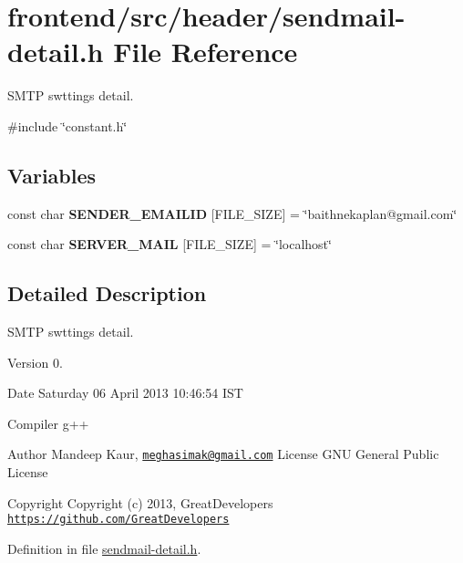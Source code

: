 \hypertarget{sendmail-detail_8h}{\section{frontend/src/header/sendmail-\/detail.h \-File \-Reference}
\label{sendmail-detail_8h}
}


\-S\-M\-T\-P swttings detail.  


{\ttfamily \#include \char`\"{}constant.\-h\char`\"{}}\*
\subsection*{\-Variables}
\begin{DoxyCompactItemize}
\item 
\hypertarget{sendmail-detail_8h_a6a17dd6df02d3a5118873bc84ce9801d}{const char {\bfseries \-S\-E\-N\-D\-E\-R\-\_\-\-E\-M\-A\-I\-L\-I\-D} \mbox{[}\-F\-I\-L\-E\-\_\-\-S\-I\-Z\-E\mbox{]} = \char`\"{}baithnekaplan@gmail.\-com\char`\"{}}\label{sendmail-detail_8h_a6a17dd6df02d3a5118873bc84ce9801d}

\item 
\hypertarget{sendmail-detail_8h_a5a43d9760874d06771eec35419dad507}{const char {\bfseries \-S\-E\-R\-V\-E\-R\-\_\-\-M\-A\-I\-L} \mbox{[}\-F\-I\-L\-E\-\_\-\-S\-I\-Z\-E\mbox{]} = \char`\"{}localhost\char`\"{}}\label{sendmail-detail_8h_a5a43d9760874d06771eec35419dad507}

\end{DoxyCompactItemize}


\subsection{\-Detailed \-Description}
\-S\-M\-T\-P swttings detail. \begin{DoxyVersion}{\-Version}
0. 
\end{DoxyVersion}
\begin{DoxyDate}{\-Date}
\-Saturday 06 \-April 2013 10\-:46\-:54 \-I\-S\-T\par
 \-Compiler g++
\end{DoxyDate}
\begin{DoxyAuthor}{\-Author}
\-Mandeep \-Kaur, \href{mailto:meghasimak@gmail.com}{\tt meghasimak@gmail.\-com} \-License \-G\-N\-U \-General \-Public \-License 
\end{DoxyAuthor}
\begin{DoxyCopyright}{\-Copyright}
\-Copyright (c) 2013, \-Great\-Developers \href{https://github.com/GreatDevelopers}{\tt https\-://github.\-com/\-Great\-Developers} 
\end{DoxyCopyright}


\-Definition in file \hyperlink{sendmail-detail_8h_source}{sendmail-\/detail.\-h}.

